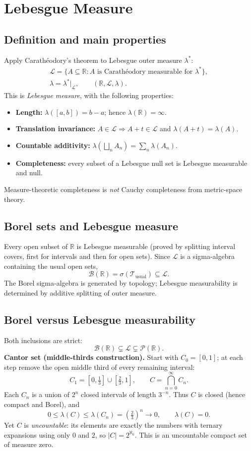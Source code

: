 \documentclass[10pt,a4paper]{article}
\newcommand{\R}{\mathbb R}
\newcommand{\B}{\mathcal B}
\newcommand{\Lcal}{\mathcal L}
\begin{document}
\section{Lebesgue Measure}
\subsection{Definition and main properties}
Apply Carath\'eodory's theorem to Lebesgue outer measure $\lambda^*$:
\[
\boxed{\begin{gathered}
\Lcal=\{A\subseteq\R:A\text{ is Carath\'eodory measurable for }\lambda^*\},\\
\lambda=\lambda^*|_{\Lcal},\qquad(\R,\Lcal,\lambda).
\end{gathered}}
\]
This is \emph{Lebesgue measure}, with the following properties:
\begin{itemize}
\item \textbf{Length:} $\lambda([a,b])=b-a$; hence $\lambda(\R)=\infty$.
\item \textbf{Translation invariance:} $A\in\Lcal\Rightarrow
A+t\in\Lcal$ and $\lambda(A+t)=\lambda(A)$.
\item \textbf{Countable additivity:} $\lambda(\bigsqcup_n A_n)=\sum_n\lambda(A_n)$.
\item \textbf{Completeness:} every subset of a Lebesgue null set is Lebesgue measurable and null.
\end{itemize}
Measure-theoretic completeness is \emph{not} Cauchy completeness from
metric-space theory.

\subsection{Borel sets and Lebesgue measure}
Every open subset of $\R$ is Lebesgue measurable (proved by splitting
interval covers, first for intervals and then for open sets). Since
$\Lcal$ is a sigma-algebra containing the usual open sets,
\[
\boxed{\B(\R)=\sigma(\mathcal T_{\mathrm{usual}})\subseteq\Lcal.}
\]
The Borel sigma-algebra is generated by topology; Lebesgue measurability
is determined by additive splitting of outer measure.

\subsection{Borel versus Lebesgue measurability}
Both inclusions are strict:
\[
\boxed{\B(\R)\subsetneq\Lcal\subsetneq\mathcal P(\R).}
\]
\textbf{Cantor set (middle-thirds construction).} Start with $C_0=[0,1]$;
at each step remove the open middle third of every remaining interval:
\[
C_1=[0,\tfrac13]\cup[\tfrac23,1],\qquad
C=\bigcap_{n=0}^{\infty}C_n.
\]
Each $C_n$ is a union of $2^n$ closed intervals of length $3^{-n}$.
Thus $C$ is closed (hence compact and Borel), and
\[
\boxed{0\le\lambda(C)\le\lambda(C_n)=(\tfrac23)^n\to0,
\qquad\lambda(C)=0.}
\]
Yet $C$ is \emph{uncountable}: its elements are exactly the numbers with
ternary expansions using only $0$ and $2$, so $|C|=2^{\aleph_0}$.
This is an uncountable compact set of measure zero.
\end{document}
